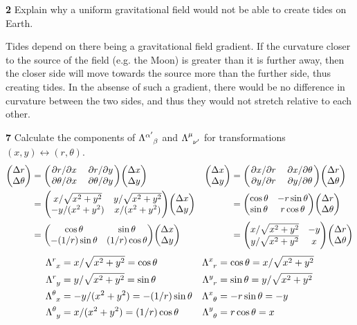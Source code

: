 \documentclass[gr-notes.tex]{subfiles}
\begin{document}
\textbf{2}
Explain why a uniform gravitational field would not be able to create tides on Earth.

Tides depend on there being a gravitational field gradient. If the curvature closer to the source of the field (e.g. the Moon) is greater than it is further away, then the closer side will move towards the source more than the further side, thus creating tides. In the absense of such a gradient, there would be no difference in curvature between the two sides, and thus they would not stretch relative to each other.



\textbf{7}
Calculate the components of $\tensor{\Lambda}{^{\alpha'}_\beta}$ and $\tensor{\Lambda}{^\mu_{\nu'}}$ for transformations $(x, y) \leftrightarrow (r, \theta)$.
~
\begin{align*}
  \mqty( \Delta r \\ \Delta \theta ) &=
  \mqty( \pdv*{r}{x}      & \pdv*{r}{y} \\
         \pdv*{\theta}{x} & \pdv*{\theta}{y} )
  \mqty( \Delta x \\ \Delta y )
  &
  \mqty( \Delta x \\ \Delta y ) &=
  \mqty( \pdv*{x}{r} & \pdv*{x}{\theta} \\
         \pdv*{y}{r} & \pdv*{y}{\theta} )
  \mqty( \Delta r \\ \Delta \theta )
  \\ &=
  \mqty( x / \sqrt{x^2+y^2} & y / \sqrt{x^2 + y^2} \\
         -y / (x^2 + y^2) & x / (x^2 + y^2) )
  \mqty( \Delta x \\ \Delta y )
  &&=
  \mqty( \cos\theta & -r \sin\theta \\
         \sin\theta &  r \cos\theta )
  \mqty( \Delta r \\ \Delta \theta )
  \\ &=
  \mqty( \cos\theta & \sin\theta \\
         -(1/r) \sin\theta & (1/r) \cos\theta )
  \mqty( \Delta x \\ \Delta y )
  &&=
  \mqty( x / \sqrt{x^2 + y^2} & -y \\
         y / \sqrt{x^2 + y^2} &  x)
  \mqty( \Delta r \\ \Delta \theta )
\end{align*}
%
\begin{align*}
  \tensor{\Lambda}{^r_x} &= x / \sqrt{x^2 + y^2} = \cos\theta
  &
  \tensor{\Lambda}{^x_r} &= \cos\theta = x / \sqrt{x^2 + y^2}
  \\
  \tensor{\Lambda}{^r_y} &= y / \sqrt{x^2 + y^2} = \sin\theta
  &
  \tensor{\Lambda}{^y_r} &= \sin\theta = y / \sqrt{x^2 + y^2}
  \\
  \tensor{\Lambda}{^\theta_x} &= -y / (x^2 + y^2) = -(1/r) \sin\theta
  &
  \tensor{\Lambda}{^x_\theta} &= -r \sin\theta = -y
  \\
  \tensor{\Lambda}{^\theta_y} &= x / (x^2 + y^2) = (1/r) \cos\theta
  &
  \tensor{\Lambda}{^y_\theta} &= r \cos\theta = x
\end{align*}
\end{document}
